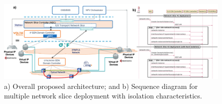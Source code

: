\documentclass[journal,article,submit,moreauthors,pdftex]{Definitions/mdpi}
\begin{document}
\begin{figure}[tb]%
\centering
	\centering
		\includegraphics[width=\linewidth]{arch.png}
\vspace{-7pt} \caption{a) Overall proposed architecture; and b) Sequence diagram for multiple network slice deployment with isolation characteristics.}
\label{fig:scheme}
\vspace{-17pt}
\end{figure}


\end{document}
